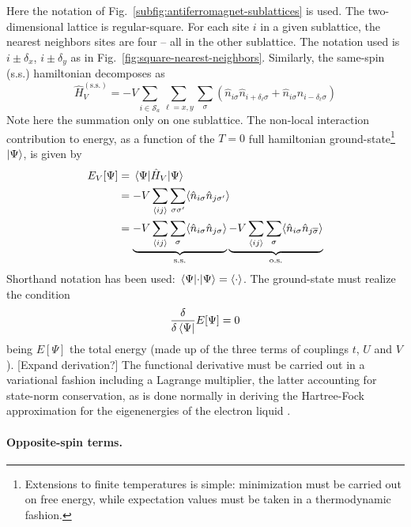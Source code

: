 Here the notation of Fig.~\ref{subfig:antiferromagnet-sublattices} is used. The two-dimensional lattice is regular-square. For each site $i$ in a given sublattice, the nearest neighbors sites are four -- all in the other sublattice. The notation used is $i \pm \delta_x$, $i \pm  \delta_y$ as in Fig.~\ref{fig:square-nearest-neighbors}. Similarly, the same-spin (s.s.) hamiltonian decomposes as
\[
	\hat H_V^{(\mathrm{s.s.})} = -V \sum_{i \in \mathcal{S}_a} \sum_{\ell = x,y} \sum_\sigma \left(
		\hat n_{i\sigma} \hat n_{i + \delta_\ell \sigma} + \hat n_{i\sigma} \hat n_{i - \delta_\ell \sigma} 
	\right) 
\]
Note here the summation only on one sublattice. 
The non-local interaction contribution to energy, as a function of the $T=0$ full hamiltonian ground-state\footnote{
	Extensions to finite temperatures is simple: minimization must be carried out on free energy, while expectation values must be taken in a thermodynamic fashion.
} $\ket{\Psi}$, is given by
\[
\begin{aligned}
	E_V [\Psi] &= \mel{\Psi}{\hat H_V}{\Psi} \\
	&= -V \sum_{\ev{ij}} \sum_{\sigma\sigma'} \langle
		\hat n_{i\sigma} \hat n_{j\sigma'}
	\rangle \\
	&= \underbrace{
		-V \sum_{\ev{ij}} \sum_{\sigma} \langle
			\hat n_{i\sigma} \hat n_{j\sigma}
		\rangle
	}_{\mathrm{s.s.}} \underbrace{
		-V \sum_{\ev{ij}} \sum_{\sigma} \langle
			\hat n_{i\sigma} \hat n_{j\overline{\sigma}}
		\rangle
	}_{\mathrm{o.s.}}
\end{aligned}
\]
Shorthand notation has been used: $\mel{\Psi}{\cdot}{\Psi} = \langle \cdot \rangle$. 
The ground-state must realize the condition
\[
\fdv{}{\bra{\Psi}} E[\Psi] = 0
\]
being $E[\Psi]$ the total energy (made up of the three terms of couplings $t$, $U$ and $V$). {\color{tabred}[Expand derivation?]} The functional derivative must be carried out in a variational fashion including a Lagrange multiplier, the latter accounting for state-norm conservation, as is done normally in deriving the Hartree-Fock approximation for the eigenenergies of the electron liquid \cite{grosso2014solid, giuliani2005quantum}. 

\paragraph{Opposite-spin terms.}

